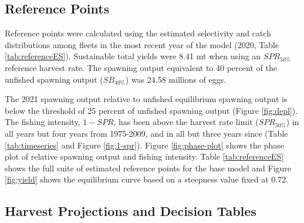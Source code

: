 \documentclass[11pt,
  english,
  letterpaper,
]{article}
\begin{document}
\leavevmode\tagmcend\tagstructend


\hypertarget{reference-points}{%
\subsection{Reference Points}\label{reference-points}}

\leavevmode\tagmcend\tagstructend


Reference points were calculated using the estimated selectivity and catch distributions among fleets in the most recent year of the model (2020, Table \ref{tab:referenceES}). Sustainable total yields were 8.41 mt when using an {\(SPR_{50\%}\)\leavevmode\tagmcend\tagstructend} reference harvest rate. The spawning output equivalent to 40 percent of the unfished spawning output ({\(SB_{40\%}\)\leavevmode\tagmcend\tagstructend}) was 24.58 millions of eggs.

\leavevmode\tagmcend\tagstructend\par


The 2021 spawning output relative to unfished equilibrium spawning output is below the threshold of 25 percent of unfished spawning output (Figure \ref{fig:depl}). The fishing intensity, {\(1-SPR\)\leavevmode\tagmcend\tagstructend}, has been above the harvest rate limit ({\(SPR_{50\%}\)\leavevmode\tagmcend\tagstructend}) in all years but four years from 1975-2009, and in all but three years since (Table \ref{tab:timeseries} and Figure \ref{fig:1-spr}). Figure \ref{fig:phase-plot} shows the phase plot of relative spawning output and fishing intensity. Table \ref{tab:referenceES} shows the full suite of estimated reference points for the base model and Figure \ref{fig:yield} shows the equilibrium curve based on a steepness value fixed at 0.72.

\leavevmode\tagmcend\tagstructend\par


\hypertarget{harvest-projections-and-decision-tables}{%
\subsection{Harvest Projections and Decision Tables}\label{harvest-projections-and-decision-tables}}
\end{document}
